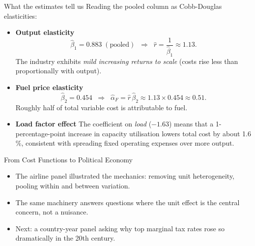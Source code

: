 \documentclass[aspectratio=169, handout]{beamer}
\numberwithin{equation}{section}
\begin{document}
\begin{frame}{What the estimates tell us}
\small Reading the pooled column as Cobb-Douglas elasticities:
  \begin{itemize}\small
    \item \textbf{Output elasticity}
      \[
        \hat\beta_1 = 0.883\;(\text{pooled}) \;\;\Longrightarrow\;\;
        \hat r = \frac{1}{\hat\beta_1} \approx 1.13.
      \] 
      The industry exhibits \emph{mild increasing returns to scale} (costs rise
      less than proportionally with output).

    \item \textbf{Fuel price elasticity}  
      \[
        \hat\beta_2 = 0.454 \;\;\Longrightarrow\;\;
        \hat\alpha_F = \hat r\,\hat\beta_2 \approx 1.13 \times 0.454 \approx 0.51.
      \]
      Roughly half of total variable cost is attributable to fuel.

    \item \textbf{Load factor effect}  
      The coefficient on \textit{load} ($-1.63$) means that a
      1-percentage-point increase in capacity utilisation lowers total cost
      by about 1.6 \%, consistent with spreading fixed operating expenses over
      more output.
  \end{itemize}
\end{frame}

\begin{frame}{From Cost Functions to Political Economy}
\begin{itemize}
\item The airline panel illustrated the mechanics: removing unit heterogeneity, pooling within and between variation.
\item The same machinery answers questions where the unit effect is the central concern, not a nuisance.
\item Next: a country-year panel asking why top marginal tax rates rose so dramatically in the 20th century.
\end{itemize}
\end{frame}
\end{document}
